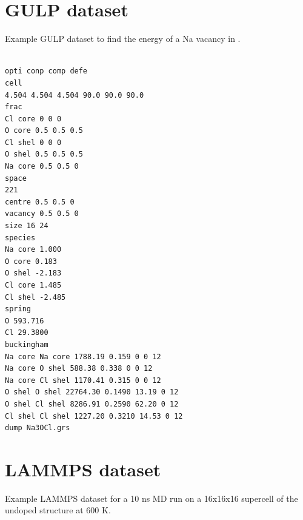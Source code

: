 \documentclass[12pt]{report}
\begin{document}
\chapter{GULP dataset}

Example GULP dataset to find the energy of a Na vacancy in .

\begin{Verbatim}[fontsize=\footnotesize]

opti conp comp defe
cell
4.504 4.504 4.504 90.0 90.0 90.0
frac
Cl core 0 0 0
O core 0.5 0.5 0.5
Cl shel 0 0 0
O shel 0.5 0.5 0.5
Na core 0.5 0.5 0
space
221
centre 0.5 0.5 0
vacancy 0.5 0.5 0
size 16 24
species
Na core 1.000
O core 0.183
O shel -2.183
Cl core 1.485
Cl shel -2.485
spring
O 593.716
Cl 29.3800
buckingham
Na core Na core 1788.19 0.159 0 0 12
Na core O shel 588.38 0.338 0 0 12
Na core Cl shel 1170.41 0.315 0 0 12
O shel O shel 22764.30 0.1490 13.19 0 12
O shel Cl shel 8286.91 0.2590 62.20 0 12
Cl shel Cl shel 1227.20 0.3210 14.53 0 12
dump Na3OCl.grs

\end{Verbatim}



\chapter{LAMMPS dataset}

Example LAMMPS dataset for a 10 ns MD run on a 16x16x16 supercell of the undoped  structure at 600 K.
\end{document}
